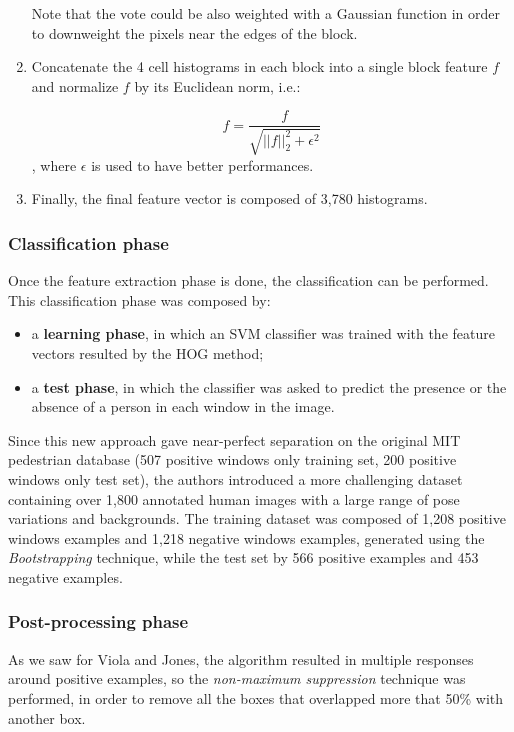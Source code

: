 \begin{enumerate}
    Note that the vote could be also weighted with a Gaussian function in order to downweight the pixels near the edges of the block.

    \item Concatenate the 4 cell histograms in each block into a single block feature $f$ and normalize $f$ by its Euclidean norm, i.e.:

    $$
    f = \frac{f}{\sqrt{||f||_2^2 + \epsilon^2}}
    $$
    , where $\epsilon$ is used to have better performances.

    \item Finally, the final feature vector is composed of 3,780 histograms.
    
\end{enumerate}

\subsubsection{Classification phase} 
Once the feature extraction phase is done, the classification can be performed. This classification phase was composed by:

\begin{itemize}
    \item a \textbf{learning phase}, in which an SVM classifier was trained with the feature vectors resulted by the HOG method;
    \item a \textbf{test phase}, in which the classifier was asked to predict the presence or the absence of a person in each window in the image.
\end{itemize}

Since this new approach gave near-perfect separation on the original MIT pedestrian database (507 positive windows only training set, 200 positive windows only test set), the authors introduced a more challenging dataset containing over 1,800 annotated human images with a large range of pose variations and backgrounds. The training dataset was composed of 1,208 positive windows examples and 1,218 negative windows examples, generated using the \textit{Bootstrapping} technique, while the test set by 566 positive examples and 453 negative examples.

\subsubsection{Post-processing phase}
As we saw for Viola and Jones, the algorithm resulted in multiple responses around positive examples, so the \textit{non-maximum suppression} technique was performed, in order to remove all the boxes that overlapped more that 50\% with another box.

